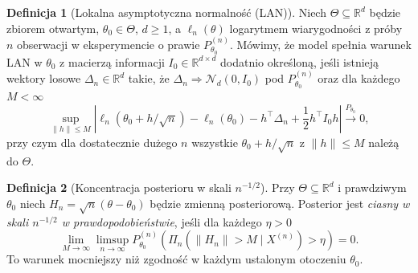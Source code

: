 \documentclass[11pt,a4paper,oneside]{report}
\numberwithin{equation}{chapter}
\theoremstyle{plain}
\theoremstyle{definition}
\newtheorem{definicja}{Definicja}[chapter]
\theoremstyle{remark}
\newcommand{\R}{\mathbb R}
\newcommand{\norm}[1]{\lVert#1\rVert}
\newcommand{\Normal}{\mathcal N}
\begin{document}
\begin{definicja}[Lokalna asymptotyczna normalność (LAN)]
\label{def:lan}
Niech $\Theta\subseteq\R^d$ będzie zbiorem otwartym,
$\theta_0\in\Theta$, $d\ge1$, a $\ell_n(\theta)$
logarytmem wiarygodności z próby $n$ obserwacji
w eksperymencie o prawie $P_{\theta_0}^{(n)}$.
Mówimy, że model spełnia warunek LAN w $\theta_0$
z macierzą informacji $I_0\in\R^{d\times d}$ dodatnio
określoną, jeśli istnieją wektory losowe $\Delta_n\in\R^d$
takie, że $\Delta_n\Rightarrow\Normal_d(0,I_0)$ pod
$P_{\theta_0}^{(n)}$ oraz dla każdego $M<\infty$
\[
 \sup_{\norm{h}\le M}\left|
 \ell_n(\theta_0+h/\sqrt n)-\ell_n(\theta_0)
 -h^\top\Delta_n+\frac12h^\top I_0h\right|
 \xrightarrow{P_{\theta_0}}0,
\]
przy czym dla dostatecznie dużego $n$ wszystkie
$\theta_0+h/\sqrt n$ z $\norm h\le M$ należą do $\Theta$.
\end{definicja}

\begin{definicja}[Koncentracja posterioru w skali $n^{-1/2}$]
\label{def:root-n-tightness}
Przy $\Theta\subseteq\R^d$ i prawdziwym $\theta_0$
niech $H_n=\sqrt n(\theta-\theta_0)$ będzie zmienną
posteriorową. Posterior jest \emph{ciasny w skali $n^{-1/2}$
w prawdopodobieństwie}, jeśli dla każdego $\eta>0$
\[
 \lim_{M\to\infty}\limsup_{n\to\infty}
 P_{\theta_0}^{(n)}\!\left(
 \Pi_n(\norm{H_n}>M\mid X^{(n)})>\eta\right)=0.
\]
To warunek mocniejszy niż zgodność w każdym ustalonym
otoczeniu $\theta_0$.
\end{definicja}
\end{document}
